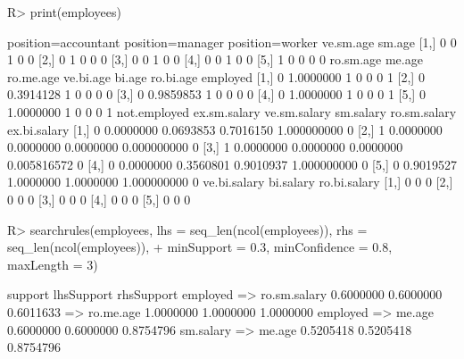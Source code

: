 \begin{Schunk}
% --begin: "searchrules"
\begin{Sinput}
R> print(employees)
\end{Sinput}
\begin{Soutput}
     position=accountant position=manager position=worker ve.sm.age sm.age
[1,]                   0                0               1         0      0
[2,]                   0                1               0         0      0
[3,]                   0                0               1         0      0
[4,]                   0                0               1         0      0
[5,]                   1                0               0         0      0
     ro.sm.age    me.age ro.me.age ve.bi.age bi.age ro.bi.age employed
[1,]         0 1.0000000         1         0      0         0        1
[2,]         0 0.3914128         1         0      0         0        0
[3,]         0 0.9859853         1         0      0         0        0
[4,]         0 1.0000000         1         0      0         0        1
[5,]         0 1.0000000         1         0      0         0        1
     not.employed ex.sm.salary ve.sm.salary sm.salary ro.sm.salary ex.bi.salary
[1,]            0    0.0000000    0.0693853 0.7016150  1.000000000            0
[2,]            1    0.0000000    0.0000000 0.0000000  0.000000000            0
[3,]            1    0.0000000    0.0000000 0.0000000  0.005816572            0
[4,]            0    0.0000000    0.3560801 0.9010937  1.000000000            0
[5,]            0    0.9019527    1.0000000 1.0000000  1.000000000            0
     ve.bi.salary bi.salary ro.bi.salary
[1,]            0         0            0
[2,]            0         0            0
[3,]            0         0            0
[4,]            0         0            0
[5,]            0         0            0
\end{Soutput}
\begin{Sinput}
R> searchrules(employees, lhs = seq_len(ncol(employees)), rhs = seq_len(ncol(employees)), 
+      minSupport = 0.3, minConfidence = 0.8, maxLength = 3)
\end{Sinput}
\begin{Soutput}
                                             support lhsSupport rhsSupport
employed => ro.sm.salary                   0.6000000  0.6000000  0.6011633
 => ro.me.age                              1.0000000  1.0000000  1.0000000
employed => me.age                         0.6000000  0.6000000  0.8754796
sm.salary => me.age                        0.5205418  0.5205418  0.8754796

\end{Soutput}
\end{Schunk}
